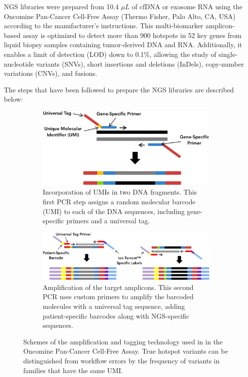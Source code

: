 NGS libraries were prepared from 10.4 $\mu L$ of cfDNA or exosome RNA using the Oncomine\texttrademark{} Pan-Cancer Cell-Free Assay (Thermo Fisher, Palo Alto, CA, USA) according to the manufacturer's instructions. This multi-biomarker amplicon-based assay is optimized to detect more than 900 hotspots in 52 key genes from liquid biopsy samples containing tumor-derived DNA and RNA. Additionally, it enables a limit of detection (LOD) down to 0.1\%, allowing the study of single-nucleotide variants (SNVs), short insertions and deletions (InDels), copy-number variations (CNVs), and fusions.

The steps that have been followed to prepare the NGS libraries are described below:

\begin{figure}[ht]
    \centering
    \begin{subfigure}{0.75\textwidth}
        \centering
        \includegraphics[width=\textwidth]{Images/chapter_3/library_prep_1.png}
        \caption{Incorporation of UMIs in two DNA fragments. This first PCR step assigns a random molecular barcode (UMI) to each of the DNA sequences, including gene-specific primers and a universal tag. \\}
        \label{fig:Library_1}
    \end{subfigure}
    \hfill
    \begin{subfigure}{0.95\textwidth}
        \centering
        \includegraphics[width=\textwidth]{Images/chapter_3/library_prep_2.png}
        \caption{Amplification of the target amplicons. This second PCR uses custom primers to amplify the barcoded molecules with a universal tag sequence, adding patient-specific barcodes along with NGS-specific sequences.}
        \label{fig:Library_2}
    \end{subfigure}
    \hfill
    \caption{Schemes of the amplification and tagging technology used in in the Oncomine\texttrademark{} Pan-Cancer Cell-Free Assay. True hotspot variants can be distinguished from workflow errors by the frequency of variants in families that have the same UMI.}
    \label{fig:Library}
\end{figure}


